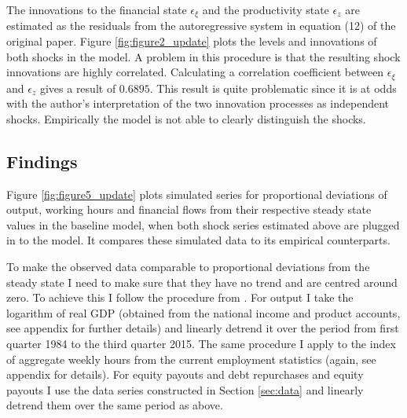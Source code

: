 

The innovations to the financial state \(\epsilon_{\xi}\) and the productivity
state \(\epsilon_{z}\) are estimated as the residuals from the autoregressive
system in equation (12) of the original paper. Figure \ref{fig:figure2_update}
plots the levels and innovations of both shocks in the model. A problem in this
procedure is that the resulting shock innovations are highly
correlated. Calculating a correlation coefficient between \(\epsilon_{\xi}\)
and \(\epsilon_z\) gives a result of $0.6895$. This result is
quite problematic since it is at odds with the author's interpretation of the
two innovation processes as independent shocks. Empirically the model is not
able to clearly distinguish the shocks.

%         

\subsection{Findings}
\label{sec:findings}

Figure \ref{fig:figure5_update} plots simulated series for proportional
deviations of output, working hours and financial flows from their respective
steady state values in the baseline model, when both shock series estimated
above are plugged in to the model. It compares these simulated data to its
empirical counterparts. 



To make the observed data comparable to proportional deviations from the steady
state I need to make sure that they have no trend and are centred around
zero. To achieve this I follow the procedure from
\textcite{jerman_macroeconomic_2012}. For output I take the logarithm of real
GDP (obtained from the national income and product accounts, see appendix for
further details) and linearly detrend it over the period from first quarter
1984 to the third quarter 2015. The same procedure I apply to the index of
aggregate weekly hours from the current employment statistics (again, see
appendix for details). For equity payouts and debt repurchases and equity
payouts I use the data series constructed in Section \ref{sec:data} and
linearly detrend them over the same period as above.
